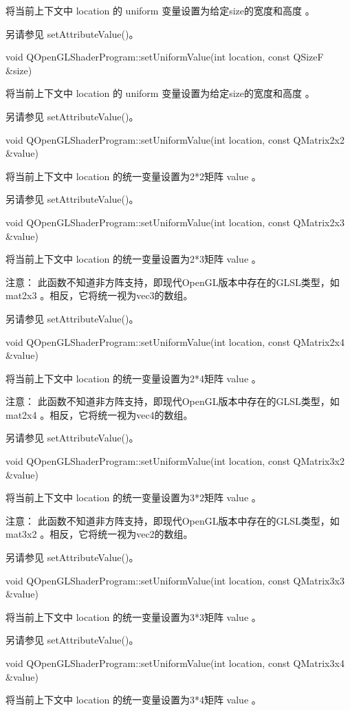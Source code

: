 将当前上下文中 location 的 uniform 变量设置为给定size的宽度和高度 。

另请参见 setAttributeValue()。

void QOpenGLShaderProgram::setUniformValue(int location, const QSizeF \&size)

将当前上下文中 location 的 uniform 变量设置为给定size的宽度和高度 。

另请参见 setAttributeValue()。

void QOpenGLShaderProgram::setUniformValue(int location, const QMatrix2x2 \&value)

将当前上下文中 location 的统一变量设置为2*2矩阵 value 。

另请参见 setAttributeValue()。

void QOpenGLShaderProgram::setUniformValue(int location, const QMatrix2x3 \&value)

将当前上下文中 location 的统一变量设置为2*3矩阵 value 。

注意： 此函数不知道非方阵支持，即现代OpenGL版本中存在的GLSL类型，如 mat2x3 。相反，它将统一视为vec3的数组。

另请参见 setAttributeValue()。

void QOpenGLShaderProgram::setUniformValue(int location, const QMatrix2x4 \&value)

将当前上下文中 location 的统一变量设置为2*4矩阵 value 。

注意： 此函数不知道非方阵支持，即现代OpenGL版本中存在的GLSL类型，如 mat2x4 。相反，它将统一视为vec4的数组。

另请参见 setAttributeValue()。

void QOpenGLShaderProgram::setUniformValue(int location, const QMatrix3x2 \&value)

将当前上下文中 location 的统一变量设置为3*2矩阵 value 。

注意： 此函数不知道非方阵支持，即现代OpenGL版本中存在的GLSL类型，如 mat3x2 。相反，它将统一视为vec2的数组。

另请参见 setAttributeValue()。

void QOpenGLShaderProgram::setUniformValue(int location, const QMatrix3x3 \&value)

将当前上下文中 location 的统一变量设置为3*3矩阵 value 。

另请参见 setAttributeValue()。

void QOpenGLShaderProgram::setUniformValue(int location, const QMatrix3x4 \&value)

将当前上下文中 location 的统一变量设置为3*4矩阵 value 。

